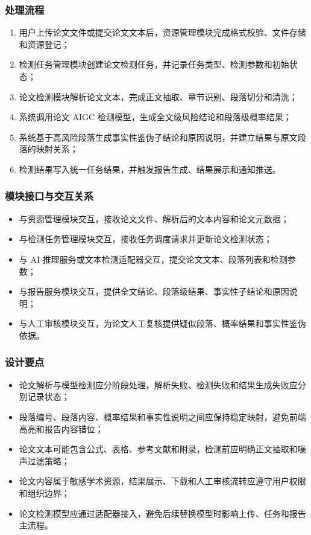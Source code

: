 \subsubsection{处理流程}
\begin{enumerate}[leftmargin=2em]
    \item 用户上传论文文件或提交论文文本后，资源管理模块完成格式校验、文件存储和资源登记；
    \item 检测任务管理模块创建论文检测任务，并记录任务类型、检测参数和初始状态；
    \item 论文检测模块解析论文文本，完成正文抽取、章节识别、段落切分和清洗；
    \item 系统调用论文 AIGC 检测模型，生成全文级风险结论和段落级概率结果；
    \item 系统基于高风险段落生成事实性鉴伪子结论和原因说明，并建立结果与原文段落的映射关系；
    \item 检测结果写入统一任务结果，并触发报告生成、结果展示和通知推送。
\end{enumerate}

\subsubsection{模块接口与交互关系}
\begin{itemize}[leftmargin=2em]
    \item 与资源管理模块交互，接收论文文件、解析后的文本内容和论文元数据；
    \item 与检测任务管理模块交互，接收任务调度请求并更新论文检测状态；
    \item 与 AI 推理服务或文本检测适配器交互，提交论文文本、段落列表和检测参数；
    \item 与报告服务模块交互，提供全文结论、段落级结果、事实性子结论和原因说明；
    \item 与人工审核模块交互，为论文人工复核提供疑似段落、概率结果和事实性鉴伪依据。
\end{itemize}

\subsubsection{设计要点}
\begin{itemize}[leftmargin=2em]
    \item 论文解析与模型检测应分阶段处理，解析失败、检测失败和结果生成失败应分别记录状态；
    \item 段落编号、段落内容、概率结果和事实性说明之间应保持稳定映射，避免前端高亮和报告内容错位；
    \item 论文文本可能包含公式、表格、参考文献和附录，检测前应明确正文抽取和噪声过滤策略；
    \item 论文内容属于敏感学术资源，结果展示、下载和人工审核流转应遵守用户权限和组织边界；
    \item 论文检测模型应通过适配器接入，避免后续替换模型时影响上传、任务和报告主流程。
\end{itemize}

